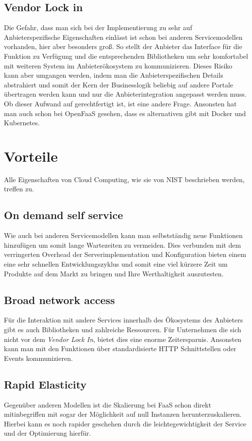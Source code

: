 \documentclass[12pt, a4paper]{article}
\begin{document}
\subsection{Vendor Lock in}
Die Gefahr, dass man sich bei der Implementierung zu sehr auf Anbieterspezifische Eigenschaften einlässt ist schon bei anderen Servicemodellen vorhanden, hier aber besonders groß.
So stellt der Anbieter das Interface für die Funktion zu Verfügung und die entsprechenden Bibliotheken um sehr komfortabel mit weiteren System im Anbieterökosystem zu kommunizieren.
Dieses Risiko kann aber umgangen werden, indem man die Anbieterspezifischen Details abstrahiert und somit der Kern der Businesslogik beliebig auf andere Portale übertragen werden kann und nur die Anbieterintegration angepasst werden muss.
Ob dieser Aufwand auf gerechtfertigt ist, ist eine andere Frage.
Ansonsten hat man auch schon bei OpenFaaS gesehen, dass es alternativen gibt mit Docker und Kubernetes.


\section{Vorteile}
Alle Eigenschaften von Cloud Computing, wie sie von \ac{NIST} beschrieben werden, treffen zu\cite{mell2011nist}.
\subsection{On demand self service}
Wie auch bei anderen Servicemodellen kann man selbstständig neue Funktionen hinzufügen um somit lange Wartezeiten zu vermeiden.
Dies verbunden mit dem verringerten Overhead der Serverimplementation und Konfiguration bieten einem eine sehr schnellen Entwicklungszyklus und somit eine viel kürzere Zeit um Produkte auf dem Markt zu bringen und Ihre Werthaltigkeit auszutesten.
\newline
\subsection{Broad network access}
Für die Interaktion mit andere Services innerhalb des Ökosystems des Anbieters gibt es auch Bibliotheken und zahlreiche Ressourcen.
Für Unternehmen die sich nicht vor dem \emph{Vendor Lock In}, bietet dies eine enorme Zeitersparnis.
Ansonsten kann man mit den Funktionen über standardisierte HTTP Schnittstellen oder Events kommunizieren.
\newline
\subsection{Rapid Elasticity}
Gegenüber anderen Modellen ist die Skalierung bei \ac{FaaS} schon direkt mitinbegriffen mit sogar der Möglichkeit auf null Instanzen herunterzuskalieren.
Hierbei kann es noch rapider geschehen durch die leichtegewichtigkeit der Service und der Optimierung hierfür.
\newline
\end{document}
